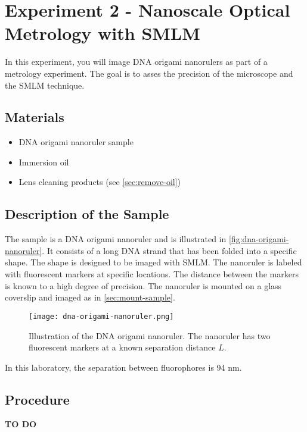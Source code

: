 \section{Experiment 2 - Nanoscale Optical Metrology with SMLM}

In this experiment, you will image DNA origami nanorulers as part of a metrology experiment. The goal is to asses the precision of the microscope and the SMLM technique.

\subsection{Materials}

\begin{itemize}
    \item{DNA origami nanoruler sample}
    \item{Immersion oil}
    \item{Lens cleaning products (see \autoref{sec:remove-oil})}
\end{itemize}

\subsection{Description of the Sample}

The sample is a DNA origami nanoruler and is illustrated in \autoref{fig:dna-origami-nanoruler}. It consists of a long DNA strand that has been folded into a specific shape. The shape is designed to be imaged with SMLM. The nanoruler is labeled with fluorescent markers at specific locations. The distance between the markers is known to a high degree of precision. The nanoruler is mounted on a glass coverslip and imaged as in \autoref{sec:mount-sample}.

\begin{figure}
    \centering
    \texttt{[image: dna-origami-nanoruler.png]}
    \caption{Illustration of the DNA origami nanoruler. The nanoruler has two fluorescent markers at a known separation distance $L$.}
    \label{fig:dna-origami-nanoruler}
\end{figure}

In this laboratory, the separation between fluorophores is 94 nm.

\subsection{Procedure}

\textbf{TO DO}
